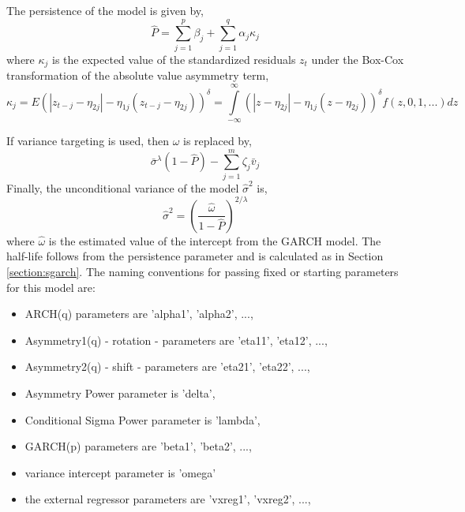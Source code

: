 The persistence of the model is given by,
\begin{equation}\label{eq:fgarchp}
\hat P = \sum\limits_{j = 1}^p {{\beta_j} + } \sum\limits_{j = 1}^q {{\alpha_j}} {\kappa_j}
\end{equation}
where $\kappa_j$ is the expected value of the standardized residuals $z_t$ under
the Box-Cox transformation of the absolute value asymmetry term,
\begin{equation}\label{eq:fgarchkappa}
{\kappa _j} = E{\left( {\left| {{z_{t - j}} - {\eta _{2j}}} \right| - {\eta _{1j}}\left( {{z_{t - j}} - {\eta _{2j}}} \right)} \right)^\delta } = \int\limits_{ - \infty }^\infty  {{{\left( {\left| {z - {\eta _{2j}}} \right| - {\eta _{1j}}\left( {z - {\eta _{2j}}} \right)} \right)}^\delta }f\left( {z,0,1,...} \right)dz}
\end{equation}

If variance targeting is used, then $\omega$ is replaced by,
\begin{equation}\label{eq:fgarchvt}
{{\bar \sigma }^\lambda }\left( {1 - \hat P} \right) - \sum\limits_{j = 1}^m {{\zeta _j}{{\bar v}_j}}
\end{equation}
Finally, the unconditional variance of the model ${\hat \sigma }^2$ is,
\begin{equation}\label{eq:fgarchuncv}
{{\hat \sigma }^2} = {\left( {\frac{{\hat \omega }}{{1 - \hat P}}} \right)^{2/\lambda }}
\end{equation}
where $\hat \omega$ is the estimated value of the intercept from the GARCH model.
The half-life follows from the persistence parameter and is calculated as in
Section \ref{section:sgarch}.
The naming conventions for passing fixed or starting parameters for this model
are:
\begin{itemize}
\item ARCH(q) parameters are 'alpha1', 'alpha2', ...,
\item Asymmetry1(q) - rotation - parameters are 'eta11', 'eta12', ...,
\item Asymmetry2(q) - shift - parameters are 'eta21', 'eta22', ...,
\item Asymmetry Power parameter is 'delta',
\item Conditional Sigma Power parameter is 'lambda',
\item GARCH(p) parameters are 'beta1', 'beta2', ...,
\item variance intercept parameter is 'omega'
\item the external regressor parameters are 'vxreg1', 'vxreg2', ...,
\end{itemize}

